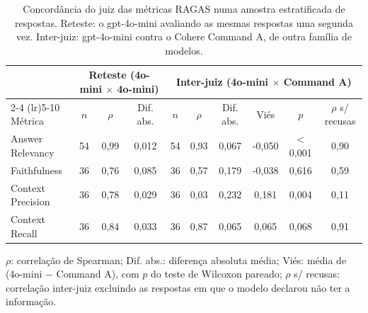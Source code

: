 \begin{table}[!t]
\centering
\footnotesize
\setlength{\tabcolsep}{4pt}
\caption{Concordância do juiz das métricas RAGAS numa amostra estratificada de respostas. Reteste: o gpt-4o-mini avaliando as mesmas respostas uma segunda vez. Inter-juiz: gpt-4o-mini contra o Cohere Command A, de outra família de modelos.}
\label{tab:concordancia_juizes}
\begin{tabular}{lccc|cccccc}
\toprule
& \multicolumn{3}{c|}{Reteste (4o-mini $\times$ 4o-mini)} & \multicolumn{6}{c}{Inter-juiz (4o-mini $\times$ Command A)} \\ \cmidrule(lr){2-4} \cmidrule(lr){5-10}
Métrica & $n$ & $\rho$ & Dif. abs. & $n$ & $\rho$ & Dif. abs. & Viés & $p$ & $\rho$ s/ recusas \\
\midrule
Answer Relevancy & 54 & 0,99 & 0,012 & 54 & 0,93 & 0,067 & -0,050 & < 0,001 & 0,90 \\
Faithfulness & 36 & 0,76 & 0,085 & 36 & 0,57 & 0,179 & -0,038 & 0,616 & 0,59 \\
Context Precision & 36 & 0,78 & 0,029 & 36 & 0,03 & 0,232 & 0,181 & 0,004 & 0,11 \\
Context Recall & 36 & 0,84 & 0,033 & 36 & 0,87 & 0,065 & 0,065 & 0,068 & 0,91 \\
\bottomrule
\end{tabular}
\par\smallskip\parbox{0.95\linewidth}{\footnotesize $\rho$: correlação de Spearman; Dif. abs.: diferença absoluta média; Viés: média de (4o-mini $-$ Command A), com $p$ do teste de Wilcoxon pareado; $\rho$ s/ recusas: correlação inter-juiz excluindo as respostas em que o modelo declarou não ter a informação.}
\end{table}

